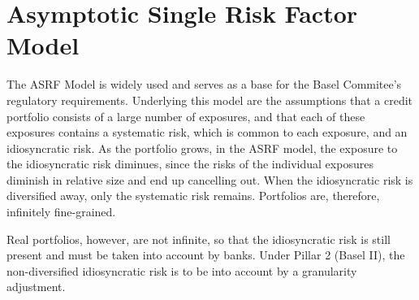 \section{Asymptotic Single Risk Factor Model}

The ASRF Model is widely used and serves as a base for the Basel Commitee's regulatory requirements.
Underlying this model are the assumptions that a credit portfolio consists of a large number of exposures, and that each of these exposures contains a systematic risk, which is common to each exposure, and an idiosyncratic risk.
As the portfolio grows, in the ASRF model, the exposure to the idiosyncratic risk diminues, since the risks of the individual exposures diminish in relative size and end up cancelling out.
When the idiosyncratic risk is diversified away, only the systematic risk remains.
Portfolios are, therefore, infinitely fine-grained.

Real portfolios, however, are not infinite, so that the idiosyncratic risk is still present and must be taken into account by banks.
Under Pillar 2 (Basel II), the non-diversified idiosyncratic risk is to be into account by a granularity adjustment.
